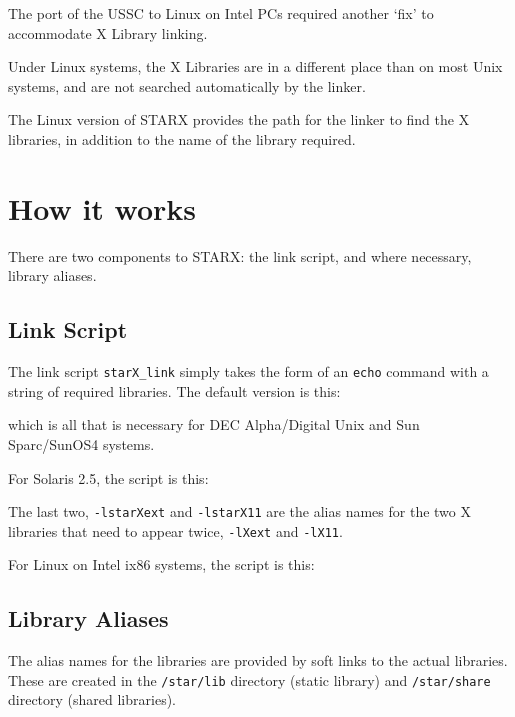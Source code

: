 \documentclass[11pt,nolof,noabs]{starlink}
\begin{document}
The port of the USSC to Linux on Intel PCs required another `fix' to
accommodate X Library linking.

Under Linux systems, the X Libraries are in a different place than on
most Unix systems, and are not searched automatically by the linker.

The Linux version of STARX provides the path for the linker to find the
X libraries, in addition to the name of the library required.

\section{How it works}

There are two components to STARX: the link script, and where
necessary, library aliases.

\subsection{Link Script}

The link script \texttt{starX\_link} simply takes the form of an \texttt{echo}
command with a string of required libraries.  The default version is
this:

\begin{terminalv}
\end{terminalv}

which is all that is necessary for DEC Alpha/Digital Unix and Sun Sparc/SunOS4
systems.

For Solaris 2.5, the script is this:

\begin{terminalv}
\end{terminalv}

The last two, \texttt{-lstarXext} and \texttt{-lstarX11} are the alias names for
the two X libraries that need to appear twice, \texttt{-lXext} and \texttt{-lX11}.

For Linux on Intel ix86 systems, the script is this:

\begin{terminalv}
\end{terminalv}

\subsection{Library Aliases}

The alias names for the libraries are provided by soft links to the
actual libraries.  These are created in the \texttt{/star/lib} directory
(static library) and \texttt{/star/share} directory (shared libraries).
\end{document}
